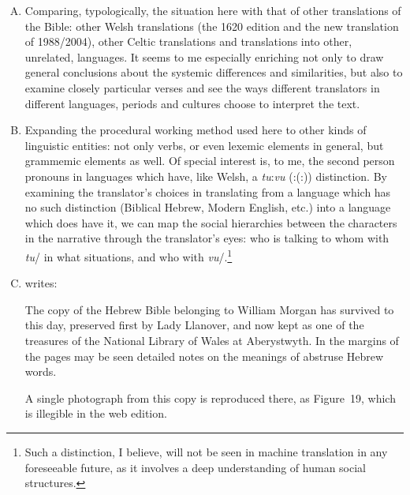 \begin{enumerate}[A.]
	\item Comparing, typologically, the situation here with that of other translations of the Bible: other Welsh translations (the 1620 edition and the new translation of 1988/2004), other Celtic translations and translations into other, unrelated, languages. It seems to me especially enriching not only to draw general conclusions about the systemic differences and similarities, but also to examine closely particular verses and see the ways different translators in different languages, periods and cultures choose to interpret the text.


	\item Expanding the procedural working method used here to other kinds of linguistic entities: not only verbs, or even lexemic elements in general, but grammemic elements as well. Of special interest is, to me, the second person pronouns in languages which have, like Welsh, a \mbox{\textit{tu}:\textit{vu}} (\mbox{:(:)}) distinction. By examining the translator’s choices in translating from a language which has no such distinction (Biblical Hebrew, Modern English, etc.) into a language which does have it, we can map the social hierarchies between the characters in the narrative through the translator’s eyes: who is talking to whom with \textit{tu}/ in what situations, and who with \textit{vu}/.\footnote{Such a distinction, I believe, will not be seen in machine translation in any foreseeable future, as it involves a deep understanding of {human} social structures.}


	\item \cite{morgan.p:1988:beibl} writes:
		\begin{changemargin}{1cm}{0cm}
			\begin{bilingquote}
				\transline
				{}
				{The copy of the Hebrew Bible belonging to William Morgan has survived to this day, preserved first by Lady Llanover, and now kept as one of the treasures of the National Library of Wales at Aberystwyth. In the margins of the pages may be seen detailed notes on the meanings of abstruse Hebrew words.}
			\end{bilingquote}
		\end{changemargin}
		\vspace{-0.5cm}
		A single photograph from this copy is reproduced there, as Figure~19, which is illegible in the web edition.


\end{enumerate}
